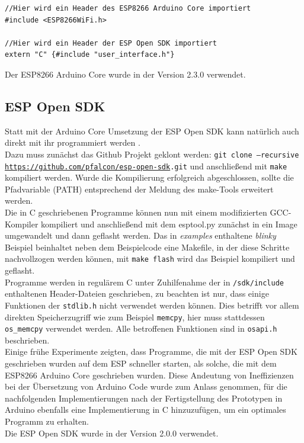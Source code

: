 \begin{verbatim}
//Hier wird ein Header des ESP8266 Arduino Core importiert
#include <ESP8266WiFi.h> 

//Hier wird ein Header der ESP Open SDK importiert
extern "C" {#include "user_interface.h"} 
\end{verbatim}

Der ESP8266 Arduino Core wurde in der Version 2.3.0 verwendet.

\subsection{ESP Open SDK}
Statt mit der Arduino Core Umsetzung der ESP Open SDK kann natürlich auch direkt mit ihr programmiert werden \cite{esp2017open}. \\
Dazu muss zunächst das Github Projekt geklont werden: \texttt{git clone --recursive \url{https://github.com/pfalcon/esp-open-sdk}.git} und anschließend mit \texttt{make} kompiliert werden.
Wurde die Kompilierung erfolgreich abgeschlossen, sollte die Pfadvariable (PATH) entsprechend der Meldung des make-Tools erweitert werden. \\
Die in C geschriebenen Programme können nun mit einem modifizierten GCC-Kompiler kompiliert und anschließend mit dem esptool.py zunächst in ein Image umgewandelt und dann geflasht werden. 
Das in \textit{examples} enthaltene \textit{blinky} Beispiel beinhaltet neben dem Beispielcode eine Makefile, in der diese Schritte nachvollzogen werden können, mit \texttt{make flash} wird das Beispiel kompiliert und geflasht. \\
Programme werden in regulärem C unter Zuhilfenahme der in \texttt{/sdk/include} enthaltenen Header-Dateien geschrieben, zu beachten ist nur, dass einige Funktionen der \texttt{stdlib.h} nicht verwendet werden können.
Dies betrifft vor allem direkten Speicherzugriff wie zum Beispiel \texttt{memcpy}, hier muss stattdessen \texttt{os\_memcpy} verwendet werden.
Alle betroffenen Funktionen sind in \texttt{osapi.h} beschrieben. \\
Einige frühe Experimente zeigten, dass Programme, die mit der ESP Open SDK geschrieben wurden auf dem ESP schneller starten, als solche, die mit dem ESP8266 Arduino Core geschrieben wurden.
Diese Andeutung von Ineffizienzen bei der Übersetzung von Arduino Code wurde zum Anlass genommen, für die nachfolgenden Implementierungen nach der Fertigstellung des Prototypen in Arduino ebenfalls eine Implementierung in C hinzuzufügen, um ein optimales Programm zu erhalten. \\
Die ESP Open SDK wurde in der Version 2.0.0 verwendet.



